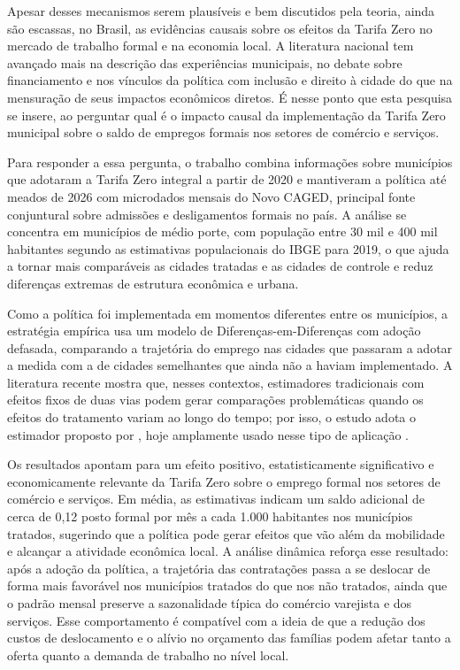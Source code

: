 \documentclass[12pt, a4paper]{article}
\begin{document}
Apesar desses mecanismos serem plausíveis e bem discutidos pela teoria, ainda são escassas, no Brasil, as evidências causais sobre os efeitos da Tarifa Zero no mercado de trabalho formal e na economia local.
A literatura nacional tem avançado mais na descrição das experiências municipais, no debate sobre financiamento e nos vínculos da política com inclusão e direito à cidade do que na mensuração de seus impactos econômicos diretos.
É nesse ponto que esta pesquisa se insere, ao perguntar qual é o impacto causal da implementação da Tarifa Zero municipal sobre o saldo de empregos formais nos setores de comércio e serviços.

Para responder a essa pergunta, o trabalho combina informações sobre municípios que adotaram a Tarifa Zero integral a partir de 2020 e mantiveram a política até meados de 2026 com microdados mensais do Novo CAGED, principal fonte conjuntural sobre admissões e desligamentos formais no país.
A análise se concentra em municípios de médio porte, com população entre 30 mil e 400 mil habitantes segundo as estimativas populacionais do IBGE para 2019, o que ajuda a tornar mais comparáveis as cidades tratadas e as cidades de controle e reduz diferenças extremas de estrutura econômica e urbana.

Como a política foi implementada em momentos diferentes entre os municípios, a estratégia empírica usa um modelo de Diferenças-em-Diferenças com adoção defasada, comparando a trajetória do emprego nas cidades que passaram a adotar a medida com a de cidades semelhantes que ainda não a haviam implementado.
A literatura recente mostra que, nesses contextos, estimadores tradicionais com efeitos fixos de duas vias podem gerar comparações problemáticas quando os efeitos do tratamento variam ao longo do tempo; por isso, o estudo adota o estimador proposto por \citet{CallawaySantanna2021}, hoje amplamente usado nesse tipo de aplicação \citep{DechaisematinDhaultfoeuille2020, goodman2021, rothsantannabilinskipoe2023}.

Os resultados apontam para um efeito positivo, estatisticamente significativo e economicamente relevante da Tarifa Zero sobre o emprego formal nos setores de comércio e serviços.
Em média, as estimativas indicam um saldo adicional de cerca de 0,12 posto formal por mês a cada 1.000 habitantes nos municípios tratados, sugerindo que a política pode gerar efeitos que vão além da mobilidade e alcançar a atividade econômica local.
A análise dinâmica reforça esse resultado: após a adoção da política, a trajetória das contratações passa a se deslocar de forma mais favorável nos municípios tratados do que nos não tratados, ainda que o padrão mensal preserve a sazonalidade típica do comércio varejista e dos serviços.
Esse comportamento é compatível com a ideia de que a redução dos custos de deslocamento e o alívio no orçamento das famílias podem afetar tanto a oferta quanto a demanda de trabalho no nível local.
\end{document}
